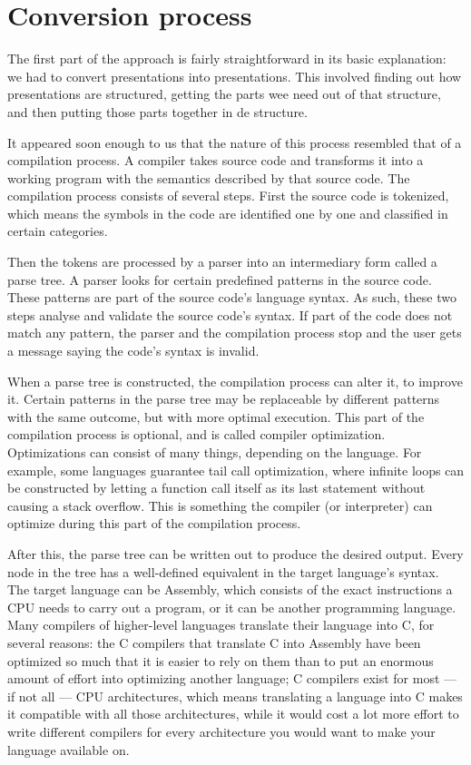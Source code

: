   \section{Conversion process}

   The first part of the approach is fairly straightforward in its basic
   explanation: we had to convert \ppt presentations into \mxp presentations.
   This involved finding out how \ppt presentations are structured, getting the
   parts wee need out of that structure, and then putting those parts together
   in de \mxp structure.

   It appeared soon enough to us that the nature of this process resembled that
   of a compilation process. A compiler takes source code and transforms it
   into a working program with the semantics described by that source code. The
   compilation process consists of several steps. First the source code is
   tokenized, which means the symbols in the code are identified one by one and
   classified in certain categories.

   Then the tokens are processed by a parser into an intermediary form called a
   parse tree. A parser looks for certain predefined patterns in the source
   code. These patterns are part of the source code's language syntax. As such,
   these two steps analyse and validate the source code's syntax. If part of
   the code does not match any pattern, the parser and the compilation process
   stop and the user gets a message saying the code's syntax is invalid.

   When a parse tree is constructed, the compilation process can alter it, to
   improve it. Certain patterns in the parse tree may be replaceable by
   different patterns with the same outcome, but with more optimal execution.
   This part of the compilation process is optional, and is called compiler
   optimization. Optimizations can consist of many things, depending on the
   language. For example, some languages guarantee tail call optimization,
   where infinite loops can be constructed by letting a function call itself as
   its last statement without causing a stack overflow. This is something the
   compiler (or interpreter) can optimize during this part of the compilation
   process.

   After this, the parse tree can be written out to produce the desired output.
   Every node in the tree has a well-defined equivalent in the target
   language's syntax. The target language can be Assembly, which consists of
   the exact instructions a CPU needs to carry out a program, or it can be
   another programming language. Many compilers of higher-level languages
   translate their language into C, for several reasons: the C compilers that
   translate C into Assembly have been optimized so much that it is easier to
   rely on them than to put an enormous amount of effort into optimizing
   another language; C compilers exist for most --- if not all --- CPU
   architectures, which means translating a language into C makes it compatible
   with all those architectures, while it would cost a lot more effort to write
   different compilers for every architecture you would want to make your
   language available on.

